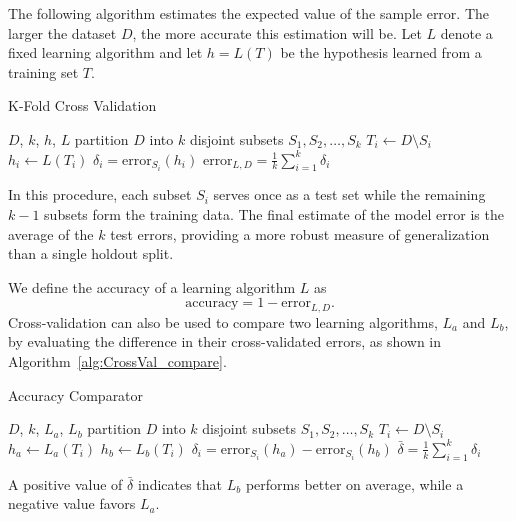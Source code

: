 \documentclass[10pt, letterpaper]{report}
\begin{document}
\bigskip
The following algorithm estimates the expected value of the sample error.
The larger the dataset $D$, the more accurate this estimation will be.
Let $L$ denote a fixed learning algorithm and let $h = L(T)$ be the hypothesis learned from a training set $T$.

\begin{algorithm}
	\caption{K-Fold Cross Validation}\label{alg:CrossVal}
	\begin{algorithmic}
		\Require $D$, $k$, $h$, $L$
		\State partition $D$ into $k$ disjoint subsets $S_1, S_2, \dots, S_k$
		\State $T_i \leftarrow D \setminus S_i$
		\State $h_i \leftarrow L(T_i)$
		\State $\delta_i = \text{error}_{S_i}(h_i)$
		\EndFor
		\State\Return $\text{error}_{L,D} = \displaystyle\frac{1}{k}\sum_{i=1}^{k}\delta_i$
	\end{algorithmic}
\end{algorithm}

In this procedure, each subset $S_i$ serves once as a test set while the remaining $k-1$ subsets form the training data.
The final estimate of the model error is the average of the $k$ test errors, providing a more robust measure of generalization than a single holdout split.

\bigskip
We define the accuracy of a learning algorithm $L$ as
\begin{equation}
	\text{accuracy} = 1 - \text{error}_{L,D}.
\end{equation}
Cross-validation can also be used to compare two learning algorithms, $L_a$ and $L_b$, by evaluating the difference in their cross-validated errors, as shown in Algorithm~\ref{alg:CrossVal_compare}.

\begin{algorithm}
	\caption{Accuracy Comparator}\label{alg:CrossVal_compare}
	\begin{algorithmic}
		\Require $D$, $k$, $L_a$, $L_b$
		\State partition $D$ into $k$ disjoint subsets $S_1,S_2,\dots,S_k$
		\For{$i=1,2,\dots,k$}
		\State $T_i \leftarrow D \setminus S_i$
		\State $h_a \leftarrow L_a(T_i)$
		\State $h_b \leftarrow L_b(T_i)$
		\State $\delta_i = \text{error}_{S_i}(h_a) - \text{error}_{S_i}(h_b)$
		\EndFor
		\State\Return $\bar{\delta} = \displaystyle\frac{1}{k}\sum_{i=1}^k \delta_i$
	\end{algorithmic}
\end{algorithm}

A positive value of $\bar{\delta}$ indicates that $L_b$ performs better on average, while a negative value favors $L_a$.
\end{document}
